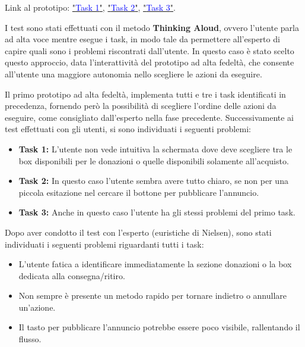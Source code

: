 \documentclass{article}
\begin{document}
Link al prototipo: \href{https://www.figma.com/proto/xET26iTanAxBERu0jhT0FS/Task?node-id=0-1&t=yNOGB0vveNBLslKN-1}{"\textcolor{blue}{Task 1}"}, \href{https://www.figma.com/proto/xET26iTanAxBERu0jhT0FS/Task?node-id=31-38&t=0zG9jnwO8AEEyY25-1}{"\textcolor{blue}{Task 2}"}, \href{https://www.figma.com/proto/xET26iTanAxBERu0jhT0FS/Task?node-id=74-42&t=yNOGB0vveNBLslKN-1}{"\textcolor{blue}{Task 3}"}.

I test sono stati effettuati con il metodo \textbf{Thinking Aloud}, ovvero l'utente parla ad alta voce mentre esegue i task, in modo tale da permettere all'esperto di capire quali sono i problemi riscontrati dall'utente.
In questo caso è stato scelto questo approccio, data l'interattività del prototipo ad alta fedeltà, che consente all'utente una maggiore autonomia nello scegliere le azioni da eseguire.

Il primo prototipo ad alta fedeltà, implementa tutti e tre i task identificati in precedenza, fornendo però la possibilità di scegliere l'ordine delle azioni da eseguire, come consigliato dall'esperto nella fase precedente.
Successivamente ai test effettuati con gli utenti, si sono individuati i seguenti problemi:
\begin{itemize}
    \item \textbf{Task 1:} L'utente non vede intuitiva la schermata dove deve scegliere tra le box disponibili per le donazioni o quelle disponibili solamente all'acquisto.
    \item \textbf{Task 2:} In questo caso l'utente sembra avere tutto chiaro, se non per una piccola esitazione nel cercare il bottone per pubblicare l'annuncio.
    \item \textbf{Task 3:} Anche in questo caso l'utente ha gli stessi problemi del primo task.
\end{itemize}


Dopo aver condotto il test con l'esperto (euristiche di Nielsen), sono stati individuati i seguenti problemi riguardanti tutti i task:
\begin{itemize}
    \item L’utente fatica a identificare immediatamente la sezione donazioni o la box dedicata alla consegna/ritiro.
    \item Non sempre è presente un metodo rapido per tornare indietro o annullare un’azione.
    \item Il tasto per pubblicare l’annuncio potrebbe essere poco visibile, rallentando il flusso.
\end{itemize}
\end{document}
